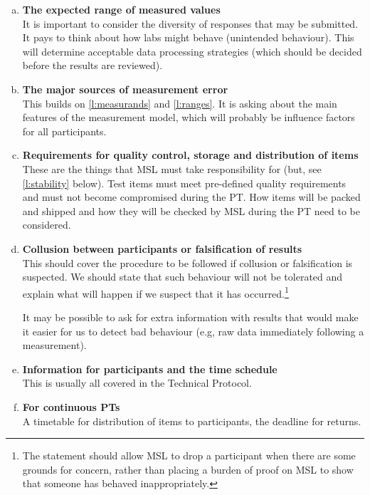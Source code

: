 \begin{enumerate}[a)]
\item	\textbf{The expected range of measured values} \\ \label{l:ranges}%
It is important to consider the diversity of responses that may be submitted. It pays to think about how labs might behave (unintended behaviour). This will determine acceptable data processing strategies (which should be decided before the results are reviewed).

\item	\textbf{The major sources of measurement error} \\
This builds on \ref{l:measurands} and \ref{l:ranges}. It is asking about the main features of the measurement model, which will probably be influence factors for all participants.


\item	\textbf{Requirements for quality control, storage and distribution of items} \\  
 \label{l:QA_requirements} 
These are the things that MSL must take responsibility for (but, see \ref{l:stability} below). Test items must meet pre-defined quality requirements and must not become compromised during the PT. How items will be packed and shipped and how they will be checked by MSL during the PT need to be considered.


\item	\textbf{Collusion between participants or falsification of results}  \\
This should cover the procedure to be followed if collusion or falsification is suspected. We should state that such behaviour will not be tolerated and explain what will happen if we suspect that it has occurred.\footnote{The statement should allow MSL to drop a participant when there are some grounds for concern, rather than placing a burden of proof on MSL to show that someone has behaved inappropriately.} 
 
It may be possible to ask for extra information with results that would make it easier for us to detect bad behaviour (e.g, raw data immediately following a measurement).


\item	\textbf{Information for participants and the time schedule}  \\
This is usually all covered in the Technical Protocol.

\item	\textbf{For continuous PTs} \\ 
A timetable for distribution of items to participants, the deadline for returns.


\end{enumerate}
